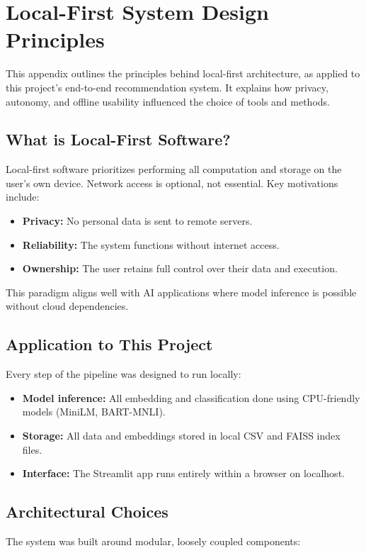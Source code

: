 \chapter{Local-First System Design Principles}
\label{appendix:local-first}

This appendix outlines the principles behind local-first architecture, as applied to this project’s end-to-end recommendation system. It explains how privacy, autonomy, and offline usability influenced the choice of tools and methods.

\section{What is Local-First Software?}
Local-first software prioritizes performing all computation and storage on the user’s own device. Network access is optional, not essential. Key motivations include:

\begin{itemize}
    \item \textbf{Privacy:} No personal data is sent to remote servers.
    \item \textbf{Reliability:} The system functions without internet access.
    \item \textbf{Ownership:} The user retains full control over their data and execution.
\end{itemize}

This paradigm aligns well with AI applications where model inference is possible without cloud dependencies.

\section{Application to This Project}
Every step of the pipeline was designed to run locally:

\begin{itemize}
    \item \textbf{Model inference:} All embedding and classification done using CPU-friendly models (MiniLM, BART-MNLI).
    \item \textbf{Storage:} All data and embeddings stored in local CSV and FAISS index files.
    \item \textbf{Interface:} The Streamlit app runs entirely within a browser on localhost.
\end{itemize}

\section{Architectural Choices}
The system was built around modular, loosely coupled components:

